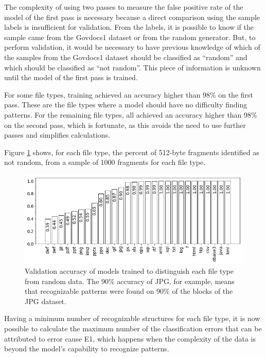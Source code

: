The complexity of using two passes to measure the false positive rate of the model of the first pass is necessary because a direct comparison using the sample labels is insufficient for validation. From the labels, it is possible to know if the sample came from the Govdocs1 dataset or from the random generator. But, to perform validation, it would be necessary to have previous knowledge of which of the samples from the Govdocs1 dataset should be classified as ``random'' and which should be classified as ``not random''. This piece of information is unknown until the model of the first pass is trained.

For some file types, training achieved an accuracy higher than 98\% on the first pass. These are the file types where a model should have no difficulty finding patterns. For the remaining file types, all achieved an accuracy higher than 98\% on the second pass, which is fortunate, as this avoids the need to use further passes and  simplifies calculations.

Figure \ref{fig:not_random} shows, for each file type, the percent of 512-byte fragments identified as not random, from a sample of 1000 fragments for each file type.

\noindent
\begin{figure}[htb!]
\centering\includegraphics[width=1.0\textwidth]{content/random.png}
\caption{\label{fig:not_random}Validation accuracy of models trained to distinguish each file type from random data. The 90\% accuracy of JPG, for example, means that recognizable patterns were found on 90\% of the blocks of the JPG dataset.}%
\end{figure}

Having a minimum number of recognizable structures for each file type, it is now possible to calculate the maximum number of the classification errors that can be attributed to error cause E1, which happens when the complexity of the data is beyond the model’s capability to recognize patterns.

